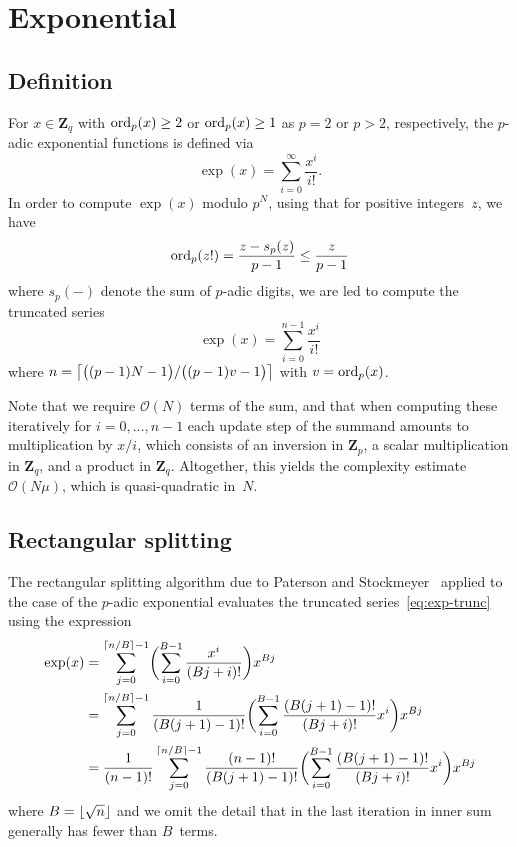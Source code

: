 \section{Exponential}

\subsection{Definition}

For $x \in \mathbf{Z}_q$ with $\operatorname{ord}_p(x) \geq 2$ or $\operatorname{ord}_p(x) \geq 1$ 
as $p=2$ or $p > 2$, respectively, the $p$-adic exponential functions is 
defined via 
\begin{equation}
\exp(x) = \sum_{i = 0}^{\infty} \frac{x^i}{i!}.
\end{equation}
In order to compute $\exp(x)$ modulo $p^N$, using that for positive 
integers~$z$, we have
\begin{equation}
\operatorname{ord}_p(z!) = \frac{z - s_p(z)}{p - 1} \leq \frac{z}{p - 1}
\end{equation}
where $s_p(-)$ denote the sum of $p$-adic digits, we are led to compute 
the truncated series 
\begin{equation} \label{eq:exp-trunc}
\exp(x) = \sum_{i = 0}^{n-1} \frac{x^i}{i!}
\end{equation}
where $n = \bigl\lceil\bigl( (p-1)N - 1 \bigr) / \bigl( (p-1)v - 1 \bigr)\bigr\rceil$ 
with $v = \operatorname{ord}_p(x)$.

Note that we require $\mathcal{O}(N)$ terms of the sum, 
and that when computing these iteratively for $i = 0, \dotsc, n-1$ 
each update step of the summand amounts to multiplication by $x / i$, 
which consists of an inversion in $\mathbf{Z}_p$, a scalar multiplication 
in $\mathbf{Z}_q$, and a product in $\mathbf{Z}_q$.  Altogether, this 
yields the complexity estimate $\mathcal{O}(N \mu)$, which is quasi-quadratic 
in~$N$.

\subsection{Rectangular splitting}

The rectangular splitting algorithm due to Paterson and 
Stockmeyer~\citep{PatersonStockmeyer1973} applied to the 
case of the $p$-adic exponential evaluates the truncated 
series~\eqref{eq:exp-trunc} using the expression 
\begin{equation}
\begin{split}
\exp(x) & = \sum_{j=0}^{\left\lceil n/B\right\rceil - 1} 
            \biggl( \sum_{i=0}^{B-1} \frac{x^i}{(Bj + i)!} \biggr) x^{Bj} \\
        & = \sum_{j=0}^{\left\lceil n/B\right\rceil - 1} 
            \frac{1}{(B (j+1) - 1)!} \biggl( \sum_{i=0}^{B-1} \frac{(B (j+1) - 1)!}{(Bj + i)!} x^i \biggr) x^{Bj} \\
        & = \frac{1}{(n-1)!} \sum_{j=0}^{\left\lceil n/B\right\rceil - 1} 
            \frac{(n-1)!}{(B (j+1) - 1)!} \biggl( \sum_{i=0}^{B-1} \frac{(B (j+1) - 1)!}{(Bj + i)!} x^i \biggr) x^{Bj}
\end{split}
\end{equation}
where $B = \lfloor\sqrt{n}\rfloor$ and we omit the detail that 
in the last iteration in inner sum generally has fewer than 
$B$~terms.

